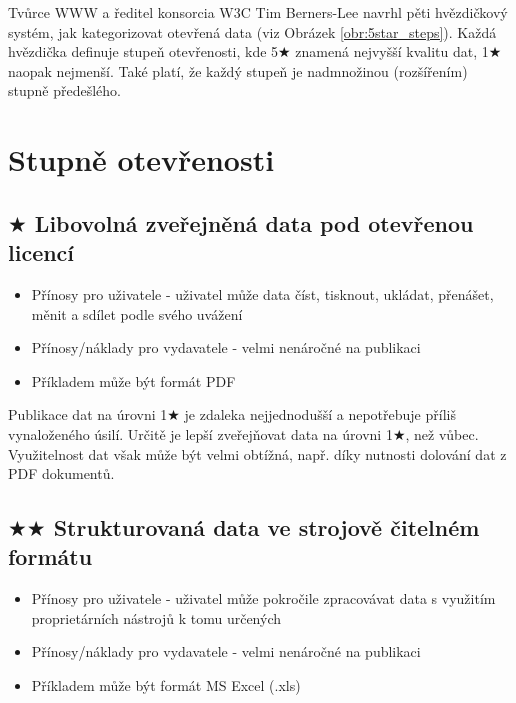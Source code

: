 Tvůrce WWW a ředitel konsorcia W3C Tim Berners-Lee navrhl pěti hvězdičkový systém, jak kategorizovat otevřená data (viz Obrázek \ref{obr:5star_steps}). Každá hvězdička definuje stupeň otevřenosti, kde 5$\bigstar$ znamená nejvyšší kvalitu dat, 1$\bigstar$ naopak nejmenší. Také platí, že každý stupeň je nadmnožinou (rozšířením) stupně předešlého.

\section{Stupně otevřenosti\protect\cite{5starInfo}}

\subsection*{$\bigstar$ Libovolná zveřejněná data pod otevřenou licencí}

\medskip

\begin{itemize}
\item Přínosy pro uživatele - uživatel může data číst, tisknout, ukládat, přenášet, měnit a sdílet podle svého uvážení
\item Přínosy/náklady pro vydavatele - velmi nenáročné na publikaci
\item Příkladem může být formát PDF
\end{itemize}

Publikace dat na úrovni 1$\bigstar$ je zdaleka nejjednodušší a nepotřebuje příliš vynaloženého úsilí. Určitě je lepší zveřejňovat data na úrovni 1$\bigstar$, než vůbec. Využitelnost dat však může být velmi obtížná, např. díky nutnosti dolování dat z PDF dokumentů.

\subsection*{$\bigstar\bigstar$ Strukturovaná data ve strojově čitelném formátu}

\medskip

\begin{itemize}
\item Přínosy pro uživatele - uživatel může pokročile zpracovávat data s využitím proprietárních nástrojů k tomu určených
\item Přínosy/náklady pro vydavatele - velmi nenáročné na publikaci
\item Příkladem může být formát MS Excel (.xls)
\end{itemize}

